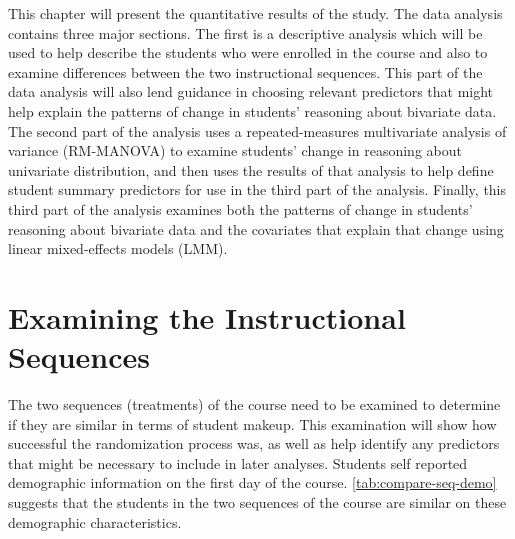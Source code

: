 \documentclass[11pt]{umnthesis}
\begin{document}
This chapter will present the quantitative results of the study. The data analysis contains three major sections. The first is a descriptive analysis which will be used to help describe the students who were enrolled in the course and also to examine differences between the two instructional sequences. This part of the data analysis will also lend guidance in choosing relevant predictors that might help explain the patterns of change in students' reasoning about bivariate data. The second part of the analysis uses a repeated-measures multivariate analysis of variance (RM-MANOVA) to examine students' change in reasoning about univariate distribution, and then uses the results of that analysis to help define student summary predictors for use in the third part of the analysis. Finally, this third part of the analysis examines both the patterns of change in students' reasoning about bivariate data and the covariates that explain that change using linear mixed-effects models (LMM).

\hypertarget{examining-the-instructional-sequences}{%
\section{Examining the Instructional Sequences}\label{examining-the-instructional-sequences}}

The two sequences (treatments) of the course need to be examined to determine if they are similar in terms of student makeup. This examination will show how successful the randomization process was, as well as help identify any predictors that might be necessary to include in later analyses. Students self reported demographic information on the first day of the course. \ref{tab:compare-seq-demo} suggests that the students in the two sequences of the course are similar on these demographic characteristics.
\end{document}

